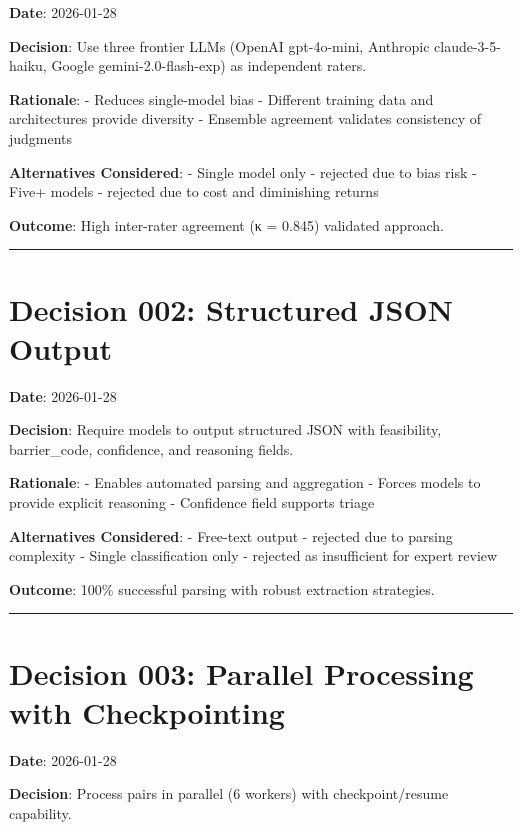 \documentclass[
  letterpaper,
]{report}
\begin{document}
\textbf{Date}: 2026-01-28

\textbf{Decision}: Use three frontier LLMs (OpenAI gpt-4o-mini,
Anthropic claude-3-5-haiku, Google gemini-2.0-flash-exp) as independent
raters.

\textbf{Rationale}: - Reduces single-model bias - Different training
data and architectures provide diversity - Ensemble agreement validates
consistency of judgments

\textbf{Alternatives Considered}: - Single model only - rejected due to
bias risk - Five+ models - rejected due to cost and diminishing returns

\textbf{Outcome}: High inter-rater agreement (κ = 0.845) validated
approach.

\begin{center}\rule{0.5\linewidth}{0.5pt}\end{center}

\section{Decision 002: Structured JSON
Output}\label{decision-002-structured-json-output}

\textbf{Date}: 2026-01-28

\textbf{Decision}: Require models to output structured JSON with
feasibility, barrier\_code, confidence, and reasoning fields.

\textbf{Rationale}: - Enables automated parsing and aggregation - Forces
models to provide explicit reasoning - Confidence field supports triage

\textbf{Alternatives Considered}: - Free-text output - rejected due to
parsing complexity - Single classification only - rejected as
insufficient for expert review

\textbf{Outcome}: 100\% successful parsing with robust extraction
strategies.

\begin{center}\rule{0.5\linewidth}{0.5pt}\end{center}

\section{Decision 003: Parallel Processing with
Checkpointing}\label{decision-003-parallel-processing-with-checkpointing}

\textbf{Date}: 2026-01-28

\textbf{Decision}: Process pairs in parallel (6 workers) with
checkpoint/resume capability.
\end{document}
